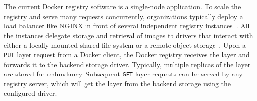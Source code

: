 The current Docker registry software is a single-node application.
%
To scale the registry and serve many requests concurrently, organizations typically deploy a load
balancer like NGINX in front of several independent registry
instances~\cite{dockerworkload, littley2019bolt}.
%
All the instances delegate storage and retrieval of images to drivers that interact with
either a locally mounted shared file system or a remote object storage~\cite{s3,azure,swift,aliyun}.
%
%
Upon a \texttt{PUT} layer request from a Docker client, the Docker registry receives the layer and forwards it to the
backend storage driver.
%
Typically, multiple replicas of the layer are stored for redundancy.
%
Subsequent \texttt{GET} layer requests can be served by any registry server,
which will get the layer from the backend storage using the configured driver.

%


%
%
%
%
%
%
%
